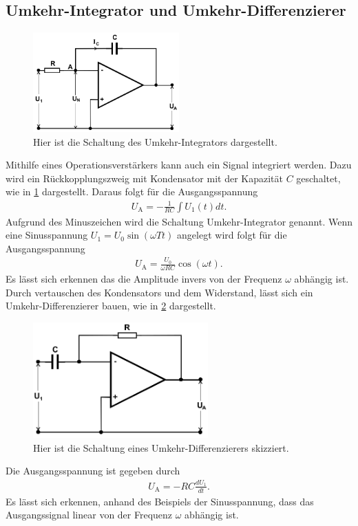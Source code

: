 \subsection{Umkehr-Integrator und Umkehr-Differenzierer}
\begin{figure}[h!]
	\centering
	\includegraphics[width=0.5\textwidth]{../Grafiken/Umkehr_Integrator.png}
	\caption{Hier ist die Schaltung des Umkehr-Integrators dargestellt. \cite{V51} \label{fig:Umkehr_Integrator}}
\end{figure}
Mithilfe eines Operationsverstärkers kann auch ein Signal integriert werden.
Dazu wird ein Rückkopplungszweig mit Kondensator mit der Kapazität $C$ geschaltet, wie in \cref{fig:Umkehr_Integrator} dargestellt.
Daraus folgt für die Ausgangsspannung
\begin{align}
	U_\text{A}=-\frac{1}{RC}\int U_1(t)dt.
\end{align}
Aufgrund des Minuszeichen wird die Schaltung Umkehr-Integrator genannt.
Wenn eine Sinusspannung $U_1=U_0\sin(\omega Tt)$ angelegt wird folgt für die Ausgangsspannung
\begin{align}
	U_\text{A}=\frac{U_0}{\omega RC}\cos(\omega t).
\end{align}
Es lässt sich erkennen das die Amplitude invers von der Frequenz $\omega$ abhängig ist.
Durch vertauschen des Kondensators und dem Widerstand, lässt sich ein Umkehr-Differenzierer bauen, wie in \cref{fig:Umkehr_Diff} dargestellt.
\begin{figure}[h!]
	\centering
	\includegraphics[width = 0.6\textwidth]{../Grafiken/Umkehr_Differentierer.png}
	\caption{Hier ist die Schaltung eines Umkehr-Differenzierers skizziert. \cite{V51}\label{fig:Umkehr_Diff}}
\end{figure}
Die Ausgangsspannung ist gegeben durch
\begin{align}
	U_\text{A}=-RC\frac{dU_1}{dt}.
\end{align}
Es lässt sich erkennen, anhand des Beispiels der Sinusspannung, dass das Ausgangssignal linear von der Frequenz $\omega$ abhängig ist.
